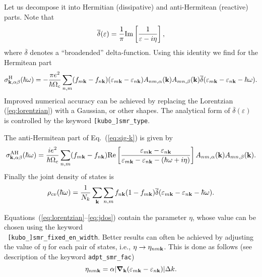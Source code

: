 Let us decompose it into Hermitian (dissipative) and anti-Hermitean
(reactive) parts. Note that
%
\begin{equation}
\label{eq:lorentzian}
\overline{\delta}(\varepsilon)=\frac{1}{\pi}{\rm Im}
\left[\frac{1}{\varepsilon-i\eta}\right],
\end{equation}
%
where $\overline{\delta}$ denotes a ``broadended''
delta-function. Using this identity we find for the Hermitean part
%
\begin{equation}
\label{eq:sig-H}
\sigma_{{\bf k},\alpha\beta}^{\rm H}(\hbar\omega)=-\frac{\pi e^2}{\hbar\Omega_c}
\sum_{n,m}(f_{m{\bf k}}-f_{n{\bf k}})
(\varepsilon_{m{\bf k}}-\varepsilon_{n{\bf k}})
A_{nm,\alpha}({\bf k})A_{mn,\beta}({\bf k})
\overline{\delta}(\varepsilon_{m{\bf k}}-\varepsilon_{n{\bf k}}-\hbar\omega).
\end{equation}
%
Improved numerical accuracy can be achieved by replacing the
Lorentzian (\ref{eq:lorentzian}) with a Gaussian, or other shapes. The
analytical form of $\overline{\delta}(\varepsilon)$ is controlled by
the keyword {\tt [kubo\_]smr\_type}.

The anti-Hermitean part of Eq.~(\ref{eq:sig-k}) is given by
%
\begin{equation}
\label{eq:sig-AH}
\sigma_{{\bf k},\alpha\beta}^{\rm AH}(\hbar\omega)=\frac{ie^2}{\hbar\Omega_c}
\sum_{n,m}(f_{m{\bf k}}-f_{n{\bf k}})
{\rm Re}\left[ \frac{\varepsilon_{m{\bf k}}-\varepsilon_{n{\bf k}}}
                    {\varepsilon_{m{\bf k}}-\varepsilon_{n{\bf k}}
                     -(\hbar\omega+i\eta)}
\right]
A_{nm,\alpha}({\bf k})A_{mn,\beta}({\bf k}).
\end{equation}
%
Finally the joint density of states is
%
\begin{equation}
\label{eq:jdos}
\rho_{cv}(\hbar\omega)=\frac{1}{N_k}\sum_{\bf k}\sum_{n,m}
f_{n{\bf k}}(1-f_{m{\bf k}})
\overline{\delta}(\varepsilon_{m{\bf k}}-\varepsilon_{n{\bf k}}-\hbar\omega).
\end{equation}

Equations~(\ref{eq:lorentzian}--\ref{eq:jdos}) contain the parameter
$\eta$, whose value can be chosen using the keyword\\ {\tt
  [kubo\_]smr\_fixed\_en\_width}. Better results can often be achieved
by adjusting the value of $\eta$ for each pair of states, i.e.,
$\eta\rightarrow \eta_{nm\bf k}$. This is done as follows (see
description of the keyword {\tt adpt\_smr\_fac})
%
\begin{equation}\label{eq:etanmk}
\eta_{nm{\bf k}}=\alpha\vert \bm{\nabla}_{\bf k}
(\varepsilon_{m{\bf k}}-\varepsilon_{n{\bf k}})\vert \Delta k.
\end{equation}

